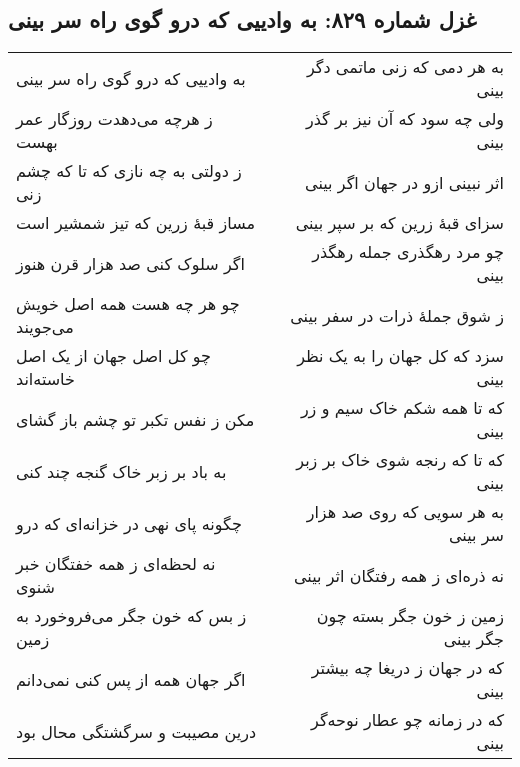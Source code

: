 \begin{center}
\section*{غزل شماره ۸۲۹: به وادییی که درو گوی راه سر بینی}
\label{sec:829}
\begin{longtable}{l p{0.5cm} r}
به وادییی که درو گوی راه سر بینی
&&
به هر دمی که زنی ماتمی دگر بینی
\\
ز هرچه می‌دهدت روزگار عمر بهست
&&
ولی چه سود که آن نیز بر گذر بینی
\\
ز دولتی به چه نازی که تا که چشم زنی
&&
اثر نبینی ازو در جهان اگر بینی
\\
مساز قبهٔ زرین که تیز شمشیر است
&&
سزای قبهٔ زرین که بر سپر بینی
\\
اگر سلوک کنی صد هزار قرن هنوز
&&
چو مرد رهگذری جمله رهگذر بینی
\\
چو هر چه هست همه اصل خویش می‌جویند
&&
ز شوق جملهٔ ذرات در سفر بینی
\\
چو کل اصل جهان از یک اصل خاسته‌اند
&&
سزد که کل جهان را به یک نظر بینی
\\
مکن ز نفس تکبر تو چشم باز گشای
&&
که تا همه شکم خاک سیم و زر بینی
\\
به باد بر زبر خاک گنجه چند کنی
&&
که تا که رنجه شوی خاک بر زبر بینی
\\
چگونه پای نهی در خزانه‌ای که درو
&&
به هر سویی که روی صد هزار سر بینی
\\
نه لحظه‌ای ز همه خفتگان خبر شنوی
&&
نه ذره‌ای ز همه رفتگان اثر بینی
\\
ز بس که خون جگر می‌فروخورد به زمین
&&
زمین ز خون جگر بسته چون جگر بینی
\\
اگر جهان همه از پس کنی نمی‌دانم
&&
که در جهان ز دریغا چه بیشتر بینی
\\
درین مصیبت و سرگشتگی محال بود
&&
که در زمانه چو عطار نوحه‌گر بینی
\\
\end{longtable}
\end{center}
